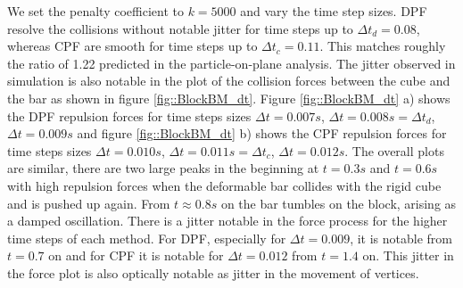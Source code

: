 We set the penalty coefficient to $k=5000$ and vary the time step sizes. %
DPF resolve the collisions without notable jitter for time steps up to $\Delta t_d=0.08$, whereas CPF are smooth for time steps up to $\Delta t_c=0.11$. This matches roughly the ratio of 1.22 predicted in the particle-on-plane analysis.
The jitter observed in simulation is also notable in the plot of the collision forces between the cube and the bar as shown in figure \ref{fig::BlockBM_dt}.
Figure \ref{fig::BlockBM_dt} a) shows the DPF repulsion forces for time steps sizes $\Delta t=0.007s$, $\Delta t=0.008s=\Delta t_d$, $\Delta t=0.009s$ and figure \ref{fig::BlockBM_dt} b) shows the CPF repulsion forces for time steps sizes $\Delta t=0.010s$, $\Delta t=0.011s=\Delta t_c$, $\Delta t=0.012s$.
The overall plots are similar, there are two large peaks in the beginning at $t=0.3s$ and $t=0.6s$ with high repulsion forces when the deformable bar collides with the rigid cube and is pushed up again.
From $t\approx0.8s$ on the bar tumbles on the block, arising as a damped oscillation. There is a jitter notable in the force process for the higher time steps of each method.
For DPF, especially for $\Delta t=0.009$, it is notable from $t=0.7$ on and for CPF  it is notable for $\Delta t=0.012$ from $t=1.4$ on. This jitter in the force plot is also optically notable as jitter in the movement of vertices.
 

